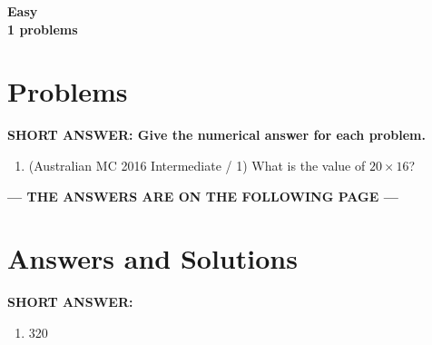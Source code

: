 \documentclass[a4paper]{article}
\begin{document}
\begin{center}{\huge\textbf{Easy\large\\1 problems}}\end{center}
\section{Problems}

\noindent\textbf{SHORT ANSWER: Give the numerical answer for each problem.}\begin{enumerate}
\item (Australian MC 2016 Intermediate / 1) What is the value of $20\times16$?\end{enumerate}\begin{center}\textbf{--- THE ANSWERS ARE ON THE FOLLOWING PAGE ---}\end{center}\newpage
\section{Answers and Solutions}
\noindent\textbf{SHORT ANSWER:}\begin{multicols}{2}\begin{enumerate}
\item 320\end{enumerate}\end{multicols}
\end{document}
